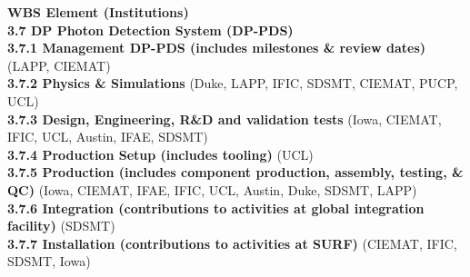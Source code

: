 {\bf WBS Element (Institutions)} \\
{\bf 3.7	DP Photon Detection  System (DP-PDS)} \\		
{\bf 3.7.1	Management DP-PDS (includes milestones \& review dates)} (LAPP, CIEMAT) \\
{\bf 3.7.2	Physics \& Simulations} (Duke, LAPP, IFIC, SDSMT, CIEMAT, PUCP, UCL) \\
{\bf 3.7.3	Design, Engineering, R\&D and validation tests} (Iowa, CIEMAT, IFIC, UCL, Austin, IFAE, SDSMT)\\
{\bf 3.7.4	Production Setup (includes tooling)} (UCL)\\
{\bf 3.7.5	Production (includes component production, assembly, testing, \& QC)} (Iowa, CIEMAT, IFAE, IFIC, UCL, Austin, Duke, SDSMT, LAPP)\\
{\bf 3.7.6	Integration (contributions to activities at global integration facility)} (SDSMT)\\
{\bf 3.7.7	Installation (contributions to activities at SURF)} (CIEMAT, IFIC, SDSMT, Iowa)\\

